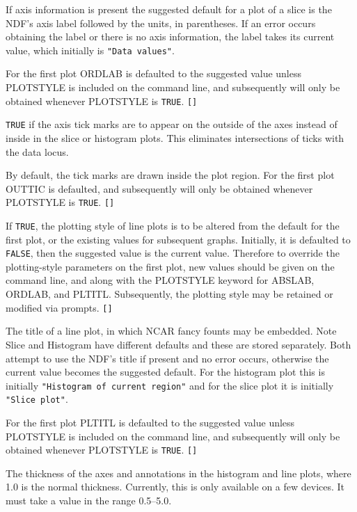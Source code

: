 \documentclass[twoside,11pt]{article}
\newcommand{\sstsubsection}[1]{ \item[{#1}] \mbox{} \\}
\renewcommand{\sstsubsection}[1]{\item[{#1}]}
\begin{document}
{{{         If axis information is present the suggested default for a
         plot of a slice is the NDF's axis label followed by the
         units, in parentheses.  If an error occurs obtaining the label
         or there is no axis information, the label takes its current
         value, which initially is {\tt "Data values"}.

         For the first plot ORDLAB is defaulted to the suggested value
         unless PLOTSTYLE is included on the command line, and
         subsequently will only be obtained whenever PLOTSTYLE is {\tt TRUE}.
         {\tt []}
      }
      \sstsubsection{
         OUTTIC = \_LOGICAL (Read)
      }{
         {\tt TRUE} if the axis tick marks are to appear on the outside of
         the axes instead of inside in the slice or histogram plots.
         This eliminates intersections of ticks with the data locus.

         By default, the tick marks are drawn inside the plot region.
         For the first plot OUTTIC is defaulted, and subsequently will
         only be obtained whenever PLOTSTYLE is {\tt TRUE}.  {\tt []}
      }
      \sstsubsection{
         PLOTSTYLE = \_LOGICAL (Read)
      }{
         If {\tt TRUE}, the plotting style of line plots is to be altered from
         the default for the first plot, or the existing values for
         subsequent graphs.  Initially, it is defaulted to {\tt FALSE}, then
         the suggested value is the current value.  Therefore to
         override the plotting-style parameters on the first plot, new
         values should be given on the command line, and along with the
         PLOTSTYLE keyword for ABSLAB, ORDLAB, and PLTITL.
         Subsequently, the plotting style may be
         retained or modified via prompts.  {\tt []}
      }
      \sstsubsection{
         PLTITL = LITERAL (Read)
      }{
         The title of a line plot, in which NCAR fancy founts may be
         embedded.  Note Slice and Histogram have different defaults
         and these are stored separately.  Both attempt to use the NDF's
         title if present and no error occurs, otherwise the current
         value becomes the suggested default.  For the histogram plot
         this is initially {\tt "Histogram of current region"} and for the
         slice plot it is initially {\tt "Slice plot"}.

         For the first plot PLTITL is defaulted to the suggested value
         unless PLOTSTYLE is included on the command line, and
         subsequently will only be obtained whenever PLOTSTYLE is {\tt TRUE}.
         {\tt []}
      }
      \sstsubsection{
         THICK = \_REAL (Read)
      }{
         The thickness of the axes and annotations in the histogram and
         line plots, where 1.0 is the normal thickness.  Currently,
         this is only available on a few devices.  It must take a value
         in the range 0.5--5.0.

}}}
\end{document}
